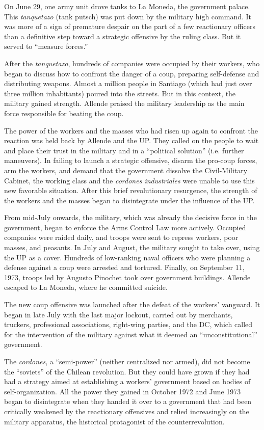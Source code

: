 On June 29, one army unit drove tanks to La Moneda, the government palace. This \emph{tanquetazo} (tank putsch) was put down by the military high command. It was more of a sign of premature despair on the part of a few reactionary officers than a definitive step toward a strategic offensive by the ruling class. But it served to ``measure forces.''

After the \emph{tanquetazo}, hundreds of companies were occupied by their workers, who began to discuss how to confront the danger of a coup, preparing self-defense and distributing weapons. Almost a million people in Santiago (which had just over three million inhabitants) poured into the streets. But in this context, the military gained strength. Allende praised the military leadership as the main force responsible for beating the coup.

The power of the workers and the masses who had risen up again to confront the reaction was held back by Allende and the UP. They called on the people to wait and place their trust in the military and in a ``political solution'' (i.e. further maneuvers). In failing to launch a strategic offensive, disarm the pro-coup forces, arm the workers, and demand that the government dissolve the Civil-Military Cabinet, the working class and the \emph{cordones industriales} were unable to use this new favorable situation. After this brief revolutionary resurgence, the strength of the workers and the masses began to disintegrate under the influence of the UP.

From mid-July onwards, the military, which was already the decisive force in the government, began to enforce the Arms Control Law more actively. Occupied companies were raided daily, and troops were sent to repress workers, poor masses, and peasants. In July and August, the military sought to take over, using the UP as a cover. Hundreds of low-ranking naval officers who were planning a defense against a coup were arrested and tortured. Finally, on September 11, 1973, troops led by Augusto Pinochet took over government buildings. Allende escaped to La Moneda, where he committed suicide.

The new coup offensive was launched after the defeat of the workers' vanguard. It began in late July with the last major lockout, carried out by merchants, truckers, professional associations, right-wing parties, and the DC, which called for the intervention of the military against what it deemed an ``unconstitutional'' government.

The \emph{cordones}, a ``semi-power'' (neither centralized nor armed), did not become the ``soviets'' of the Chilean revolution. But they could have grown if they had had a strategy aimed at establishing a workers' government based on bodies of self-organization. All the power they gained in October 1972 and June 1973 began to disintegrate when they handed it over to a government that had been critically weakened by the reactionary offensives and relied increasingly on the military apparatus, the historical protagonist of the counterrevolution.

